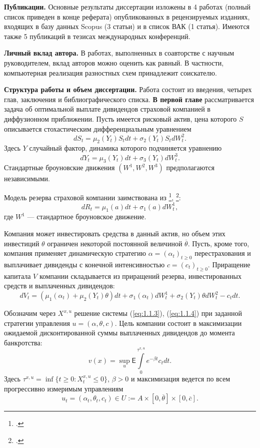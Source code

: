\documentclass[twoside,12pt]{article}
\begin{document}
\textbf{Публикации.} Основные результаты  диссертации изложены в  4 работах (полный список приведен в конце реферата) опубликованных в рецензируемых изданиях, входящих в базу данных Scopus (3 статьи) и в список ВАК (1 статья). Имеются также 5 публикаций в тезисах международных конференций.

\textbf{Личный вклад автора.} В работах, выполненных в соавторстве с научным руководителем, вклад авторов можно оценить как равный. В частности, компьютерная реализация разностных схем принадлежит соискателю.

\textbf{Структура работы и объем диссертации.} Работа состоит из введения, четырех глав, заключения и библиографического списка. \textbf{В первой главе} рассматривается задача об оптимальной выплате дивидендов страховой компанией в диффузионном приближении.
Пусть имеется рисковый актив, цена которого $S$ описывается стохастическим дифференциальным уравнением
$$ dS_t= \mu_2 (Y_t) S_t dt +\sigma_2 (Y_t) S_t d W^2_t. $$
Здесь $Y$ случайный фактор, динамика которого подчиняется уравнению
\begin{equation} \label{eq:1.1.3}
dY_t=\mu_3(Y_t)dt+\sigma_3 (Y_t) d W_t^3.
\end{equation}
Стандартные броуновские движения $(W^1,W^2,W^3)$ предполагаются независимыми.

Модель резерва страховой компании заимствована из \footcite{AsmHojTak00},  \footcite{HogTak04}:
$$ d R_t=\mu_1(a) dt+\sigma_1 (a) dW^1_t, $$
где $W^1$ --- стандартное броуновское движение.

Компания может инвестировать средства в данный актив, но объем этих инвестиций $\theta$ ограничен некоторой постоянной величиной $\overline\theta$. Пусть, кроме того, компания применяет динамическую стратегию $\alpha=(\alpha_t)_{t\ge 0}$ перестрахования и выплачивает дивиденды с конечной интенсивностью $c=(c_t)_{t\ge 0}$.
Приращение капитала $V$ компании складывается из приращений резерва, инвестированных средств и выплаченных дивидендов:
\begin{equation} \label{eq:1.1.4}
dV_t=(\mu_1(\alpha_t)+\mu_2(Y_t) \theta)dt +\sigma_1(\alpha_t) d W_t^1+\sigma_2(Y_t) \theta d W_t^2-c_t dt.
\end{equation}

Обозначим через $X^{x,u}$ решение системы (\ref{eq:1.1.3}), (\ref{eq:1.1.4}) при заданной стратегии управления $u=(\alpha,\theta,c)$. Цель компании состоит в максимизации ожидаемой дисконтированной суммы выплаченных дивидендов до момента банкротства:
$$ v(x)=\sup_{u}\mathsf E \int\limits_{0}^{\tau^{x,u}} e^{-\beta t} c_t dt. $$
Здесь $\tau^{x,u}=\inf\{t\ge 0: X_t^{x,u}\le 0\}$, $\beta>0$ и максимизация ведется по всем прогрессивно измеримым управлениям
$$ u_t=(\alpha_t,\theta_t,c_t)\in U:=A\times [0,\overline\theta]\times [0,\overline c].$$
\end{document}
